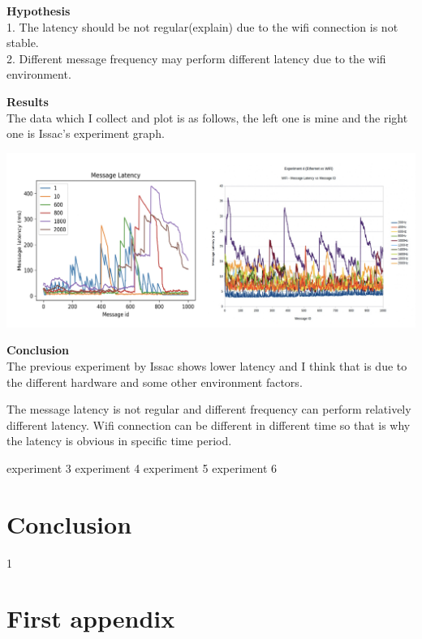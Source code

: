 \documentclass{mproj}
\begin{document}
\textbf{Hypothesis} \\
1. The latency should be not regular(explain) due to the wifi connection is not stable. \\
2. Different message frequency may perform different latency due to the wifi environment.

\textbf{Results} \\
The data which I collect and plot is as follows, the left one is mine and the right one is Issac's experiment graph.

\includegraphics[width = 1\textwidth]{compare_issac.jpg}

\textbf{Conclusion} \\
The previous experiment by Issac shows lower latency and I think that is due to the different hardware and some other environment factors.

The message latency is not regular and different frequency can perform relatively different latency. Wifi connection can be different in different time so that is why the latency is obvious in specific time period.


\clearpage
experiment 3
\clearpage
experiment 4
\clearpage
experiment 5
\clearpage
experiment 6


\chapter{Conclusion}\label{conclusion}
1






\appendix %
\chapter{First appendix}
\end{document}
